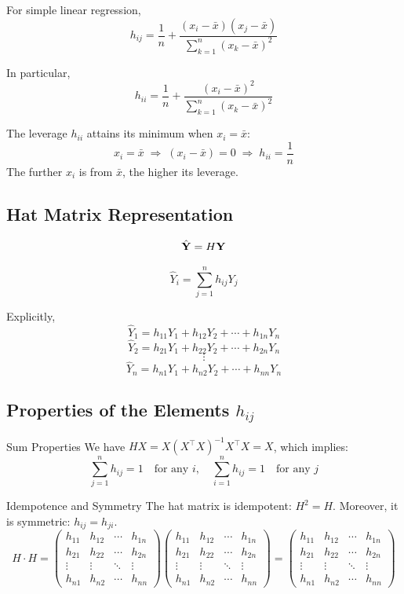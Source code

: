 For simple linear regression,
\[
h_{ij} = \frac{1}{n} + \frac{(x_i - \bar{x})(x_j - \bar{x})}{\sum_{k=1}^{n} (x_k - \bar{x})^2}
\]

In particular,
\[
h_{ii} = \frac{1}{n} + \frac{(x_i - \bar{x})^2}{\sum_{k=1}^{n} (x_k - \bar{x})^2}
\]

\begin{keyresult}
The leverage $h_{ii}$ attains its minimum when $x_i = \bar{x}$:
\[
x_i = \bar{x} \;\Rightarrow\; (x_i - \bar{x}) = 0 \;\Rightarrow\; h_{ii} = \frac{1}{n}
\]
The further $x_i$ is from $\bar{x}$, the higher its leverage.
\end{keyresult}

\subsection{Hat Matrix Representation}

\[
\hat{\mathbf{Y}} = H\mathbf{Y}
\]

\[
\hat{Y}_i = \sum_{j=1}^{n} h_{ij} Y_j
\]

Explicitly,
\[
\hat{Y}_1 = h_{11}Y_1 + h_{12}Y_2 + \cdots + h_{1n}Y_n
\]
\[
\hat{Y}_2 = h_{21}Y_1 + h_{22}Y_2 + \cdots + h_{2n}Y_n
\]
\[
\vdots
\]
\[
\hat{Y}_n = h_{n1}Y_1 + h_{n2}Y_2 + \cdots + h_{nn}Y_n
\]

\subsection{Properties of the Elements $h_{ij}$}

\begin{prop}{Sum Properties}
We have $HX = X (X^\top X)^{-1} X^\top X = X$, which implies:
$$
\sum_{j=1}^{n} h_{ij} = 1 \quad \text{for any } i, \quad
\sum_{i=1}^{n} h_{ij} = 1 \quad \text{for any } j
$$
\end{prop}

\begin{prop}{Idempotence and Symmetry}
The hat matrix is idempotent: $H^2 = H$. Moreover, it is symmetric: $h_{ij} = h_{ji}$.
\[
H \cdot H =
\begin{pmatrix}
h_{11} & h_{12} & \cdots & h_{1n} \\
h_{21} & h_{22} & \cdots & h_{2n} \\
\vdots & \vdots & \ddots & \vdots \\
h_{n1} & h_{n2} & \cdots & h_{nn}
\end{pmatrix}
\begin{pmatrix}
h_{11} & h_{12} & \cdots & h_{1n} \\
h_{21} & h_{22} & \cdots & h_{2n} \\
\vdots & \vdots & \ddots & \vdots \\
h_{n1} & h_{n2} & \cdots & h_{nn}
\end{pmatrix}
=
\begin{pmatrix}
h_{11} & h_{12} & \cdots & h_{1n} \\
h_{21} & h_{22} & \cdots & h_{2n} \\
\vdots & \vdots & \ddots & \vdots \\
h_{n1} & h_{n2} & \cdots & h_{nn}
\end{pmatrix}
\]
\end{prop}

